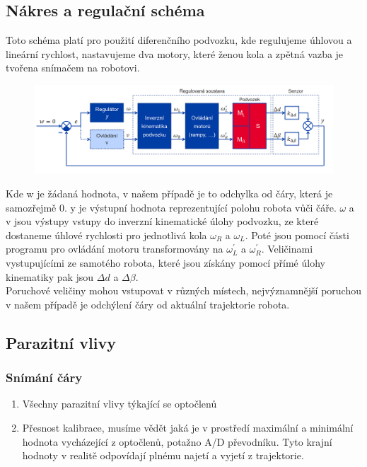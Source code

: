 \subsection{Nákres a regulační schéma}
Toto schéma platí pro použití diferenčního podvozku, kde regulujeme úhlovou a lineární rychlost, nastavujeme dva motory, které ženou kola a zpětná vazba je tvořena snímačem na robotovi.

\begin{figure}[h!]
    \centering
    \includegraphics[scale = 0.3]{img/RegSoust.png}
\end{figure}
Kde w je žádaná hodnota, v našem případě je to odchylka od čáry, která je samozřejmě 0. y je výstupní hodnota reprezentující polohu robota vůči čáře. \(\omega \) a v jsou výstupy vstupy do inverzní kinematické úlohy podvozku, ze které dostaneme úhlové rychlosti pro jednotlivá kola \(\omega_R\) a \(\omega_L\). Poté jsou pomocí části programu pro ovládání motoru transformovány na \(\omega_{L}^{'}\) a \(\omega_{R}^{'}\). Veličinami vystupujícími ze samotého robota, které jsou získány pomocí přímé úlohy kinematiky pak jsou \(\Delta d\) a \(\Delta \beta \).\\

Poruchové veličiny mohou vstupovat v různých místech, nejvýznamnější poruchou v našem případě je odchýlení čáry od aktuální trajektorie robota.\\

\subsection{Parazitní vlivy}
\subsubsection{Snímání čáry}
\begin{enumerate}
    \item Všechny parazitní vlivy týkající se optočlenů
    \item Přesnost kalibrace, musíme vědět jaká je v prostředí maximální a minimální hodnota vycházející z optočlenů, potažno A/D převodníku. Tyto krajní hodnoty v realitě odpovídají plnému najetí a vyjetí z trajektorie.
\end{enumerate}

